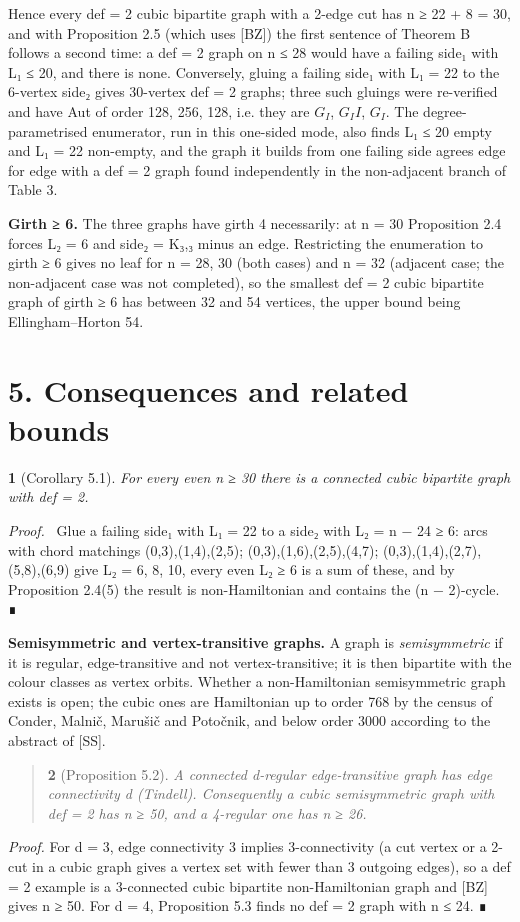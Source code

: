 \documentclass[11pt,a4paper]{article}
\theoremstyle{named}
\newtheorem*{namedthm}{}
\newenvironment{mdproof}[1][Proof]{\par\medskip\noindent\textit{#1.}\ }{\par\medskip}
\begin{document}
Hence every def = 2 cubic bipartite graph with a 2-edge cut has n ≥ 22 + 8 = 30, and with Proposition 2.5 (which uses [BZ]) the first sentence of Theorem B follows a second time: a def = 2 graph on n ≤ 28 would have a failing side₁ with L₁ ≤ 20, and there is none. Conversely, gluing a failing side₁ with L₁ = 22 to the 6-vertex side₂ gives 30-vertex def = 2 graphs; three such gluings were re-verified and have Aut of order 128, 256, 128, i.e. they are $G_I$, $G_II$, $G_I$. The degree-parametrised enumerator, run in this one-sided mode, also finds L₁ ≤ 20 empty and L₁ = 22 non-empty, and the graph it builds from one failing side agrees edge for edge with a def = 2 graph found independently in the non-adjacent branch of Table 3.

\textbf{Girth ≥ 6.} The three graphs have girth 4 necessarily: at n = 30 Proposition 2.4 forces L₂ = 6 and side₂ = K₃,₃ minus an edge. Restricting the enumeration to girth ≥ 6 gives no leaf for n = 28, 30 (both cases) and n = 32 (adjacent case; the non-adjacent case was not completed), so the smallest def = 2 cubic bipartite graph of girth ≥ 6 has between 32 and 54 vertices, the upper bound being Ellingham–Horton 54.

\section*{5. Consequences and related bounds}
\begin{namedthm}[Corollary 5.1]
For every even n ≥ 30 there is a connected cubic bipartite graph with def = 2.
\end{namedthm}
\begin{mdproof}[Proof]
Glue a failing side₁ with L₁ = 22 to a side₂ with L₂ = n − 24 ≥ 6: arcs with chord matchings (0,3),(1,4),(2,5); (0,3),(1,6),(2,5),(4,7); (0,3),(1,4),(2,7),(5,8),(6,9) give L₂ = 6, 8, 10, every even L₂ ≥ 6 is a sum of these, and by Proposition 2.4(5) the result is non-Hamiltonian and contains the (n − 2)-cycle. ∎
\end{mdproof}

\textbf{Semisymmetric and vertex-transitive graphs.} A graph is \textit{semisymmetric} if it is regular, edge-transitive and not vertex-transitive; it is then bipartite with the colour classes as vertex orbits. Whether a non-Hamiltonian semisymmetric graph exists is open; the cubic ones are Hamiltonian up to order 768 by the census of Conder, Malnič, Marušič and Potočnik, and below order 3000 according to the abstract of [SS].

\begin{quote}
\begin{namedthm}[Proposition 5.2]
A connected d-regular edge-transitive graph has edge connectivity d (Tindell). Consequently a cubic semisymmetric graph with def = 2 has n ≥ 50, and a 4-regular one has n ≥ 26.
\end{namedthm}
\end{quote}
\textit{Proof.} For d = 3, edge connectivity 3 implies 3-connectivity (a cut vertex or a 2-cut in a cubic graph gives a vertex set with fewer than 3 outgoing edges), so a def = 2 example is a 3-connected cubic bipartite non-Hamiltonian graph and [BZ] gives n ≥ 50. For d = 4, Proposition 5.3 finds no def = 2 graph with n ≤ 24. ∎
\end{document}
